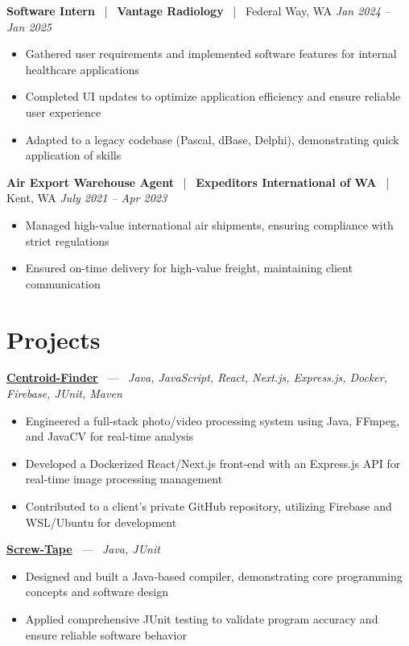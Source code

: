 \documentclass[10pt, letterpaper]{article}
\newcommand{\jobhead}[4]{%
  \vspace{5pt}%
  {\bfseries\color{dark}#1}%
  ~{\color{light}|}~%
  {\bfseries\color{navy}#2}%
  ~{\color{light}|}~%
  {\color{light}#3}%
  \hfill{\color{light}\small\textit{#4}}\\[-2pt]%
}
\newcommand{\projhead}[3]{%
  \vspace{5pt}%
  {\bfseries\color{dark}\href{#2}{#1}}%
  ~{\color{light}---}~%
  {\color{light}\small\textit{#3}}\\[-2pt]%
}
\begin{document}
\jobhead{Software Intern}{Vantage Radiology}{Federal Way, WA}{Jan 2024 – Jan 2025}
\begin{itemize}
  \item Gathered user requirements and implemented software features for internal healthcare applications
  \item Completed UI updates to optimize application efficiency and ensure reliable user experience
  \item Adapted to a legacy codebase (Pascal, dBase, Delphi), demonstrating quick application of skills
\end{itemize}

\jobhead{Air Export Warehouse Agent}{Expeditors International of WA}{Kent, WA}{July 2021 – Apr 2023}
\begin{itemize}
  \item Managed high-value international air shipments, ensuring compliance with strict regulations
  \item Ensured on-time delivery for high-value freight, maintaining client communication
\end{itemize}

\section{Projects}

\projhead{Centroid-Finder}{https://github.com/xavierb117/centroid-finder}{Java, JavaScript, React, Next.js, Express.js, Docker, Firebase, JUnit, Maven}
\begin{itemize}
  \item Engineered a full-stack photo/video processing system using Java, FFmpeg, and JavaCV for real-time analysis
  \item Developed a Dockerized React/Next.js front-end with an Express.js API for real-time image processing management
  \item Contributed to a client's private GitHub repository, utilizing Firebase and WSL/Ubuntu for development
\end{itemize}

\projhead{Screw-Tape}{https://github.com/timmyd4/screwtape}{Java, JUnit}
\begin{itemize}
  \item Designed and built a Java-based compiler, demonstrating core programming concepts and software design
  \item Applied comprehensive JUnit testing to validate program accuracy and ensure reliable software behavior
\end{itemize}
\end{document}
